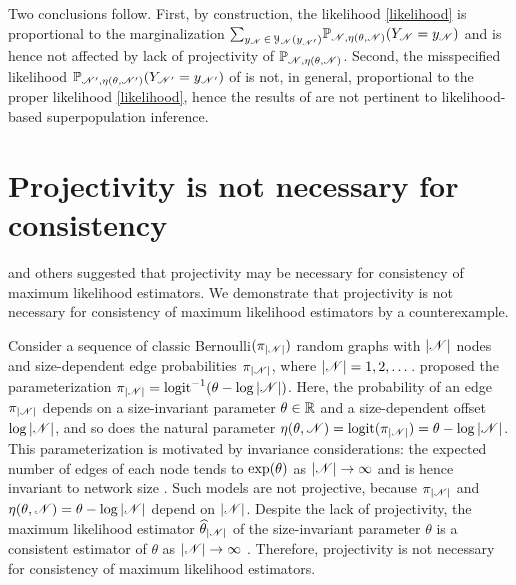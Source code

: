 \documentclass[12pt]{article}
\begin{document}
Two conclusions follow.
First,
by construction,
the likelihood \eqref{likelihood} is proportional to the marginalization ${\sum_{y_{\mathscr{N}}\, \in\, \mathcal{Y}_{\mathscr{N}}(y_{\mathscr{N}'})}}\mathbb{P}_{\mathscr{N},\eta(\theta, \mathscr{N})}(Y_{\mathscr{N}} = y_{\mathscr{N}})$ and is hence not affected by lack of projectivity of $\mathbb{P}_{\mathscr{N},\eta(\theta, \mathscr{N})}$. 
Second,
the misspecified likelihood $\mathbb{P}_{\mathscr{N}',\eta(\theta, \mathscr{N}')}(Y_{\mathscr{N}'} = y_{\mathscr{N}'})$ of \citeauthor{ShRi11} is not, 
in general, 
proportional to the proper likelihood \eqref{likelihood}, 
hence the results of \citeauthor{ShRi11} are not pertinent to likelihood-based superpopulation inference.

\section{Projectivity is not necessary for consistency}
\label{sec:meandeg}

\citet{Fien12} and others suggested that projectivity may be necessary for consistency of maximum likelihood estimators.
We demonstrate that projectivity is not necessary for consistency of maximum likelihood estimators by a counterexample.  

Consider a sequence of classic Bernoulli$(\pi_{|\mathscr{N}|})$ random graphs \citep{ErRe60} with $|\mathscr{N}|$ nodes and size-dependent edge probabilities $\pi_{|\mathscr{N}|}$,
where $|\mathscr{N}| = 1, 2, \dotsc$.\linebreak
\citet{KrHaMo11} proposed the parameterization $\pi_{|\mathscr{N}|} = \operatorname{logit}^{-1}(\theta-\log |\mathscr{N}|)$.
Here,
the probability of an edge $\pi_{|\mathscr{N}|}$ depends on a size-invariant parameter $\theta \in \mathbb{R}$ and a size-dependent offset $\log {|\mathscr{N}|}$,
and so does the natural parameter $\eta(\theta, \mathscr{N}) = \operatorname{logit}(\pi_{|\mathscr{N}|}) = \theta - \log |\mathscr{N}|$.
This parameterization is motivated by invariance considerations:
the expected number of edges of each node tends to $\exp(\theta)$ as $|\mathscr{N}|\to\infty$ and is hence invariant to network size
\citep{KrHaMo11}.
Such models are not projective,
because $\pi_{|\mathscr{N}|}$ and $\eta(\theta, \mathscr{N}) = \theta - \log |\mathscr{N}|$ depend on $|\mathscr{N}|$.
Despite the lack of projectivity,
the maximum likelihood estimator $\widehat{\theta}_{|\mathscr{N}|}$ of the size-invariant parameter $\theta$ is a consistent estimator of $\theta$ as ${|\mathscr{N}|}\to\infty$ \citep[][Theorem 3.1]{KrKo14}.  
Therefore,
projectivity is not necessary for consistency of maximum likelihood estimators.
\end{document}
